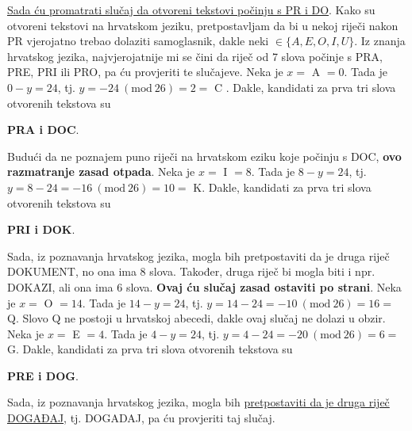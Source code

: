 \documentclass[a4paper,12pt,oneside]{article}
\begin{document}
\noindent \underline{Sada ću promatrati slučaj da otvoreni tekstovi počinju s PR i DO}. Kako su otvoreni tekstovi na hrvatskom jeziku, pretpostavljam da bi u nekoj riječi nakon PR vjerojatno trebao dolaziti samoglasnik, dakle neki $\in \{A, E, O, I, U\}.$ Iz znanja hrvatskog jezika, najvjerojatnije mi se čini da riječ od 7 slova počinje s PRA, PRE, PRI ili PRO, pa ću provjeriti te slučajeve.
\newline \newline
Neka je $x =$ A $= 0$. Tada je $0 - y = 24$, tj. $y = -24 \ (\text{mod} \ 26) = 2 = $ C .  Dakle, kandidati za prva tri slova otvorenih tekstova su
\begin{center}
	\textbf{PRA i DOC}.
\end{center}
Budući da ne poznajem puno riječi na hrvatskom eziku koje počinju s DOC, \textbf{ovo razmatranje zasad otpada}.
\newline\newline
\noindent Neka je $x =$ I $= 8$. Tada je $8 - y = 24$, tj. $y = 8 - 24 = -16 \ (\text{mod} \ 26) = 10 =$ K. Dakle, kandidati za prva tri slova otvorenih tekstova su
\begin{center}
	\textbf{PRI i DOK}.
\end{center}
Sada, iz poznavanja hrvatskog jezika, mogla bih pretpostaviti da je druga riječ DOKUMENT, no ona ima 8 slova. Također, druga riječ bi mogla biti i npr. DOKAZI, ali ona ima 6 slova. \textbf{Ovaj ću slučaj zasad ostaviti po strani}.
\newline \newline
Neka je $x =$ O $= 14$. Tada je $14 - y = 24$, tj. $y = 14 - 24 = -10 \ (\text{mod} \ 26) = 16 = $  Q. Slovo Q ne postoji u hrvatskoj abecedi, dakle ovaj slučaj ne dolazi u obzir.
\newline \newline
Neka je $x =$ E $= 4$. Tada je $4 - y = 24$, tj. $y = 4 - 24 = -20 \ (\text{mod} \ 26) = 6 = $  G. Dakle, kandidati za prva tri slova otvorenih tekstova su
\begin{center}
	\textbf{PRE i DOG}.
\end{center}
Sada, iz poznavanja hrvatskog jezika, mogla bih \underline{pretpostaviti da je druga riječ DOGAĐAJ}, tj. DOGADAJ, pa ću provjeriti taj slučaj.
\end{document}
